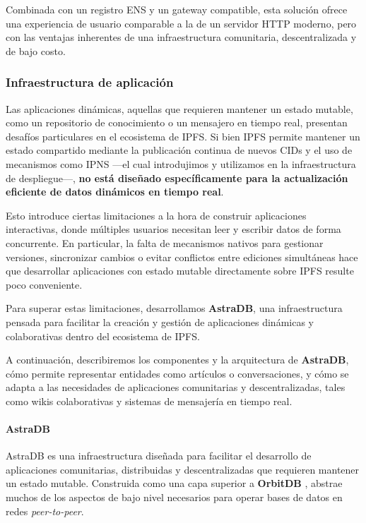 Combinada con un registro ENS y un gateway compatible, esta solución ofrece una experiencia de usuario comparable a la de un servidor HTTP moderno, pero con las ventajas inherentes de una infraestructura comunitaria, descentralizada y de bajo costo.

\subsubsection{Infraestructura de aplicación}

Las aplicaciones dinámicas, aquellas que requieren mantener un estado mutable, como un repositorio de conocimiento o un mensajero en tiempo real, presentan desafíos particulares en el ecosistema de IPFS. Si bien IPFS permite mantener un estado compartido mediante la publicación continua de nuevos CIDs y el uso de mecanismos como IPNS —el cual introdujimos y utilizamos en la infraestructura de despliegue—, \textbf{no está diseñado específicamente para la actualización eficiente de datos dinámicos en tiempo real}.

Esto introduce ciertas limitaciones a la hora de construir aplicaciones interactivas, donde múltiples usuarios necesitan leer y escribir datos de forma concurrente. En particular, la falta de mecanismos nativos para gestionar versiones, sincronizar cambios o evitar conflictos entre ediciones simultáneas hace que desarrollar aplicaciones con estado mutable directamente sobre IPFS resulte poco conveniente.

Para superar estas limitaciones, desarrollamos \textbf{AstraDB}, una infraestructura pensada para facilitar la creación y gestión de aplicaciones dinámicas y colaborativas dentro del ecosistema de IPFS.

A continuación, describiremos los componentes y la arquitectura de \textbf{AstraDB}, cómo permite representar entidades como artículos o conversaciones, y cómo se adapta a las necesidades de aplicaciones comunitarias y descentralizadas, tales como wikis colaborativas y sistemas de mensajería en tiempo real.

\paragraph{AstraDB}

AstraDB es una infraestructura diseñada para facilitar el desarrollo de aplicaciones comunitarias, distribuidas y descentralizadas que requieren mantener un estado mutable. Construida como una capa superior a \textbf{OrbitDB} \cite{orbitdb}, abstrae muchos de los aspectos de bajo nivel necesarios para operar bases de datos en redes \textit{peer-to-peer}.

